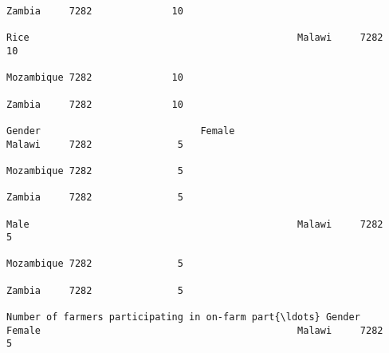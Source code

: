 \documentclass[11pt]{article}
\begin{document}
\begin{Verbatim}[commandchars=\\\{\}]
                                                                                                                                                                                                                 Zambia     7282              10  
                                                                                                                                                              Rice                                               Malawi     7282              10  
                                                                                                                                                                                                                 Mozambique 7282              10  
                                                                                                                                                                                                                 Zambia     7282              10  
                                                                                                                            Gender                            Female                                             Malawi     7282               5  
                                                                                                                                                                                                                 Mozambique 7282               5  
                                                                                                                                                                                                                 Zambia     7282               5  
                                                                                                                                                              Male                                               Malawi     7282               5  
                                                                                                                                                                                                                 Mozambique 7282               5  
                                                                                                                                                                                                                 Zambia     7282               5  
                                                                         Number of farmers participating in on-farm part{\ldots} Gender                            Female                                             Malawi     7282               5  

\end{Verbatim}
\end{document}
